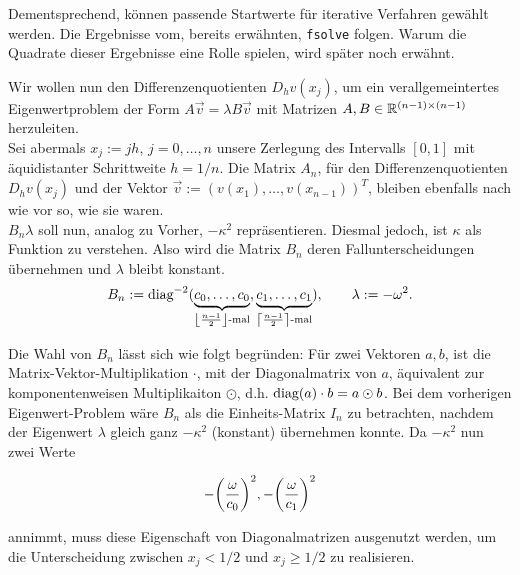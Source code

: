 Dementsprechend, können passende Startwerte für iterative Verfahren gewählt werden. Die Ergebnisse vom, bereits erwähnten, \verb|fsolve| folgen. Warum die Quadrate dieser Ergebnisse eine Rolle spielen, wird später noch erwähnt.

\begin{multicols}{2}

\end{multicols}

Wir wollen nun den Differenzenquotienten $D_h v(x_j)$, um ein verallgemeintertes Eigenwertproblem der Form $A \vec v = \lambda B \vec v$ mit Matrizen $A, B \in \mathbb{R}^{(n-1) \times (n-1)}$ herzuleiten. \\

Sei abermals $x_j := jh$, $j = 0, \ldots, n$ unsere Zerlegung des Intervalls $[0, 1]$ mit äquidistanter Schrittweite $h = 1/n$. Die Matrix $A_n$, für den Differenzenquotienten $D_h v(x_j)$ und der Vektor $\vec v := (v(x_1), \ldots, v(x_{n-1}))^T$, bleiben ebenfalls nach wie vor so, wie sie waren. \\

$B_n \lambda$ soll nun, analog zu Vorher, $-\kappa^2$ repräsentieren. Diesmal jedoch, ist $\kappa$ als Funktion zu verstehen. Also wird die Matrix $B_n$ deren Fallunterscheidungen übernehmen und $\lambda$ bleibt konstant. \\

\begin{align*}
  B_n :=
  \text{diag}^{-2}
  (
    \underbrace{c_0, \ldots, c_0}_{{\left \lfloor \frac{n-1}{2} \right \rfloor} \text{-mal}},
    \underbrace{c_1, \ldots, c_1}_{{\left \lceil \frac{n-1}{2} \right \rceil } \text{-mal}}
  ), \qquad
  \lambda := -\omega^2.
\end{align*}

Die Wahl von $B_n$ lässt sich wie folgt begründen: Für zwei Vektoren $a, b$, ist die Matrix-Vektor-Multiplikation $\cdot$, mit der Diagonalmatrix von $a$, äquivalent zur komponentenweisen Multiplikaiton $\odot$, d.h. $\text{diag}(a) \cdot b = a \odot b$. Bei dem vorherigen Eigenwert-Problem wäre $B_n$ als die Einheits-Matrix $I_n$ zu betrachten, nachdem der Eigenwert $\lambda$ gleich ganz $-\kappa^2$ (konstant) übernehmen konnte. Da $-\kappa^2$ nun zwei Werte

\begin{align*}
  -{\left ( \frac{\omega}{c_0} \right )}^2, -{\left ( \frac{\omega}{c_1} \right )}^2
\end{align*}

annimmt, muss diese Eigenschaft von Diagonalmatrizen ausgenutzt werden, um die Unterscheidung zwischen $x_j < 1/2$ und $x_j \geq 1/2$ zu realisieren. \\

